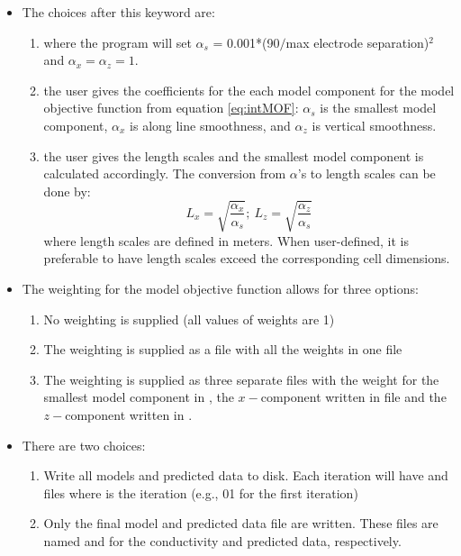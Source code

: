 \begin{itemize}
%
\item [\fileName{ALPHA}] The choices after this keyword are: 
\begin{enumerate}
\item {} where the program will set $\alpha_s$ = 0.001*(90$/$max electrode separation)$^2$ and $\alpha_x = \alpha_z = 1$. 
\item {} the user gives the coefficients for the each model component for the model objective function from equation \ref{eq:intMOF}: $\alpha_s$ is the smallest model component, $\alpha_x$ is along line smoothness, and $\alpha_z$ is vertical smoothness.
\item{} the user gives the length scales and the smallest model component is calculated accordingly. The conversion from $\alpha$'s to length scales can be done by:
\begin{equation}
L_x = \sqrt{\frac{\alpha_x}{\alpha_s}} ; ~L_z = \sqrt{\frac{\alpha_z}{\alpha_s}}
\end{equation}
where length scales are defined in meters. When user-defined, it is preferable to have length scales exceed the corresponding cell dimensions.
\end{enumerate}
%
\item[\fileName{WEIGHT}] The weighting for the model objective function allows for three options:
\begin{enumerate}
\item{} No weighting is supplied (all values of weights are 1)
\item{} The weighting is supplied as a  file with all the weights in one file 
\item{} The weighting is supplied as three separate  files with the weight for the smallest model component in , the $x-$component written in file  and the $z-$component written in .
\end{enumerate}
%
\item[{\scriptsize\fileName{STORE\_ALL\_MODELS}}] There are two choices:
\begin{enumerate}
\item{} Write all models and predicted data to disk. Each iteration will have  and  files where  is the iteration (e.g., 01 for the first iteration)
\item{} Only the final model and predicted data file are written. These files are named  and  for the conductivity and predicted data, respectively.

\end{enumerate}
\end{itemize}
